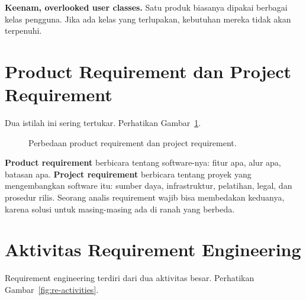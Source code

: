 \documentclass[11pt,a4paper]{article}
\begin{document}
\textbf{Keenam, overlooked user classes.} Satu produk biasanya dipakai berbagai kelas pengguna. Jika ada kelas yang terlupakan, kebutuhan mereka tidak akan terpenuhi.

\section{Product Requirement dan Project Requirement}

Dua istilah ini sering tertukar. Perhatikan Gambar~\ref{fig:prod-vs-proj}.

\begin{figure}[H]
	\centering
	\caption{Perbedaan product requirement dan project requirement.}
	\label{fig:prod-vs-proj}
\end{figure}

\textbf{Product requirement} berbicara tentang software-nya: fitur apa, alur apa, batasan apa. \textbf{Project requirement} berbicara tentang proyek yang mengembangkan software itu: sumber daya, infrastruktur, pelatihan, legal, dan prosedur rilis. Seorang analis requirement wajib bisa membedakan keduanya, karena solusi untuk masing-masing ada di ranah yang berbeda.

\section{Aktivitas Requirement Engineering}

Requirement engineering terdiri dari dua aktivitas besar. Perhatikan Gambar~\ref{fig:re-activities}.
\end{document}
